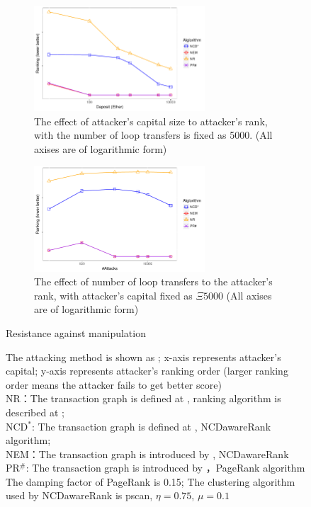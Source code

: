 \begin{figure}[!ht]
	\centering
	\begin{subfigure}{\linewidth}
		\centering
		\includegraphics[width=0.7\textwidth]{figs/AttackDeposit.pdf}
		\caption{The effect of attacker's capital size to attacker's rank, with the number of loop transfers is fixed as 5000. \small{(All axises are of logarithmic form)}}
		\label{subfig:deposit}
	\end{subfigure}
	
	\begin{subfigure}{\linewidth}
	    \centering
		\includegraphics[width=0.7\textwidth]{figs/AttackTimes.pdf} 
		\caption{The effect of number of loop transfers to the attacker's rank, with attacker's capital fixed as $\Xi5000$ \small{(All axises are of logarithmic form)}}\label{subfig:times}
	\end{subfigure}

	\caption{Resistance against manipulation} \label{fig:antiManipulation}
	\caption*{\footnotesize{The attacking method is shown as ; x-axis represents attacker's capital; y-axis represents attacker's ranking order (larger ranking order means the attacker fails to get better score)  \\
	NR：The transaction graph is defined at , ranking algorithm is described at ; \\
	NCD$^*$: The transaction graph is defined at , NCDawareRank algorithm; \\
	NEM：The transaction graph is introduced by \cite{nem}, NCDawareRank\\ 
	PR$^{\#}$: The transaction graph is introduced by \cite{nem}，PageRank algorithm\\ 
	The damping factor of PageRank is 0.15; The clustering algorithm used by NCDawareRank is pscan\cite{chang2017mathsf}, $\eta=0.75$, $\mu=0.1$}}
\end{figure}

